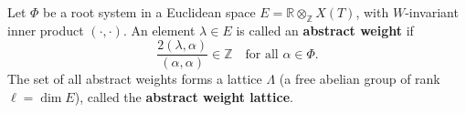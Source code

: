 Let $\Phi$ be a root system in a Euclidean space $E = \mathbb{R} \otimes_{\mathbb{Z}} X(T)$, with $W$-invariant inner product $(\cdot,\cdot)$. An element $\lambda \in E$ is called an \textbf{abstract weight} if
$$\frac{2(\lambda, \alpha)}{(\alpha, \alpha)} \in \mathbb{Z} \quad \text{for all } \alpha \in \Phi.$$
The set of all abstract weights forms a lattice $\Lambda$ (a free abelian group of rank $\ell = \dim E$), called the \textbf{abstract weight lattice}.
